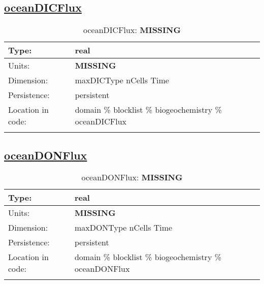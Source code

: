 \subsection[oceanDICFlux]{\hyperref[sec:var_tab_biogeochemistry]{oceanDICFlux}}
\label{subsec:var_sec_biogeochemistry_oceanDICFlux}
\begin{center}
\begin{longtable}{| p{2.0in} | p{4.0in} |}
        \hline 
        Type: & real \\
        \hline 
        Units: & {\bf \color{red} MISSING} \\
        \hline 
        Dimension: & maxDICType nCells Time \\
        \hline 
        Persistence: & persistent \\
        \hline 
         Location in code: & domain \% blocklist \% biogeochemistry \% oceanDICFlux \\
         \hline 
    \caption{oceanDICFlux: {\bf \color{red} MISSING}}
\end{longtable}
\end{center}
\subsection[oceanDONFlux]{\hyperref[sec:var_tab_biogeochemistry]{oceanDONFlux}}
\label{subsec:var_sec_biogeochemistry_oceanDONFlux}
\begin{center}
\begin{longtable}{| p{2.0in} | p{4.0in} |}
        \hline 
        Type: & real \\
        \hline 
        Units: & {\bf \color{red} MISSING} \\
        \hline 
        Dimension: & maxDONType nCells Time \\
        \hline 
        Persistence: & persistent \\
        \hline 
         Location in code: & domain \% blocklist \% biogeochemistry \% oceanDONFlux \\
         \hline 
    \caption{oceanDONFlux: {\bf \color{red} MISSING}}
\end{longtable}
\end{center}
